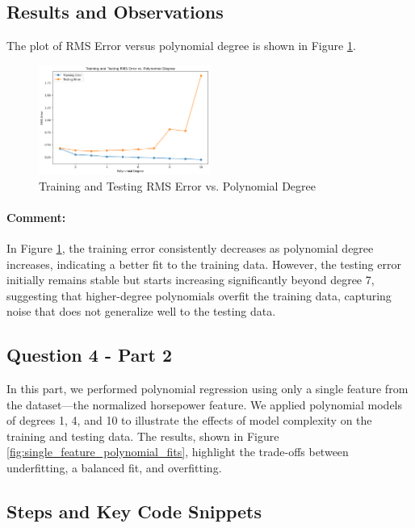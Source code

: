 \documentclass{article}
\begin{document}
	\subsection*{Results and Observations}
	
	The plot of RMS Error versus polynomial degree is shown in Figure \ref{fig:rms_error_vs_degree}.
	
	\begin{figure}[h!]
		\centering
		\includegraphics[width=0.5\textwidth]{./images/q4_part1.png}
		\caption{Training and Testing RMS Error vs. Polynomial Degree}
		\label{fig:rms_error_vs_degree}
	\end{figure}
	
	\paragraph{Comment:} In Figure \ref{fig:rms_error_vs_degree}, the training error consistently decreases as polynomial degree increases, indicating a better fit to the training data. However, the testing error initially remains stable but starts increasing significantly beyond degree 7, suggesting that higher-degree polynomials overfit the training data, capturing noise that does not generalize well to the testing data.
	
	\subsection*{Question 4 - Part 2}
	
	In this part, we performed polynomial regression using only a single feature from the dataset—the normalized horsepower feature. We applied polynomial models of degrees 1, 4, and 10 to illustrate the effects of model complexity on the training and testing data. The results, shown in Figure \ref{fig:single_feature_polynomial_fits}, highlight the trade-offs between underfitting, a balanced fit, and overfitting.
	
	\subsection*{Steps and Key Code Snippets}
	
\end{document}
